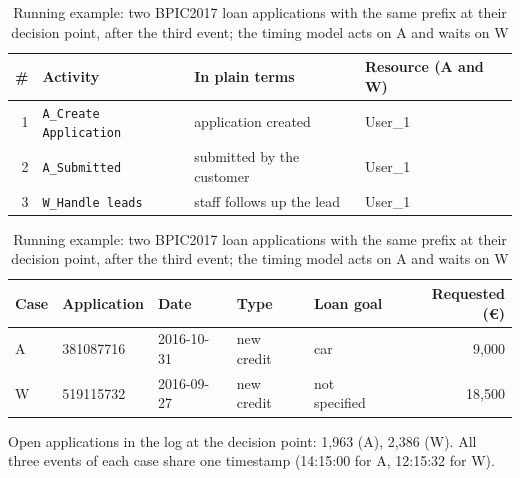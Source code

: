 \begin{table}[!htb]
\centering
\caption{Running example: two BPIC2017 loan applications with the same prefix at their decision point, after the third event; the timing model acts on A and waits on W}
\label{tab:running}
\footnotesize
\setlength{\tabcolsep}{3pt}
\begin{tabular}{@{}rlll@{}}
\toprule
\# & Activity & In plain terms & Resource (A and W) \\
\midrule
  1 & \texttt{A\_Create Application} & application created & User\_1 \\
  2 & \texttt{A\_Submitted} & submitted by the customer & User\_1 \\
  3 & \texttt{W\_Handle leads} & staff follows up the lead & User\_1 \\
\bottomrule
\end{tabular}

\smallskip
\begin{tabular}{@{}lllllr@{}}
\toprule
Case & Application & Date & Type & Loan goal & Requested (\euro{}) \\
\midrule
  A & 381087716 & 2016-10-31 & new credit & car & 9,000 \\
  W & 519115732 & 2016-09-27 & new credit & not specified & 18,500 \\
\bottomrule
\end{tabular}

\smallskip
{\footnotesize Open applications in the log at the decision point: 1,963 (A), 2,386 (W). All three events of each case share one timestamp (14:15:00 for A, 12:15:32 for W).}
\end{table}
